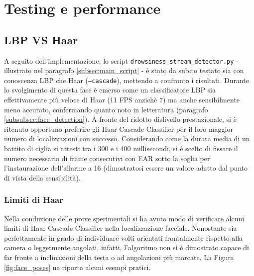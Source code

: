 \documentclass[12pt]{article}
\begin{document}
\newpage



\section{Testing e performance}

\subsection{LBP VS Haar}
A seguito dell'implementazione, lo script \texttt{drowsiness\_stream\_detector.py} - illustrato nel paragrafo \ref{subsec:main_script} -  è stato da subito testato sia con conoscenza LBP che Haar (\texttt{--cascade}), mettendo a confronto i risultati. Durante lo svolgimento di questa fase è emerso come un classificatore LBP sia effettivamente più veloce di Haar (11 FPS anzichè 7) ma anche sensibilmente meno accurato, confermando quanto noto in letteratura (paragrafo \ref{subsubsec:face_detection}). A fronte del ridotto dislivello prestazionale, si è ritenuto opportuno preferire gli Haar Cascade Classifier per il loro maggior numero di localizzazioni con successo. Considerando come la durata media di un battito di ciglia si attesti tra i 300 e i 400 millisecondi, si è scelto di fissare il numero necessario di frame consecutivi con EAR sotto la soglia per l'instaurazione dell'allarme a 16 (dimostratosi essere un valore adatto dal punto di vista della sensibilità).

\subsubsection{Limiti di Haar}
Nella conduzione delle prove sperimentali si ha avuto modo di verificare alcuni limiti di Haar Cascade Classifier nella localizzazione facciale. Nonostante sia perfettamente in grado di individuare volti orientati frontalmente rispetto alla camera o leggermente angolati, infatti, l'algoritmo non si è dimostrato capace di far fronte a inclinazioni della testa o ad angolazioni più marcate. La Figura \ref{fig:face_poses} ne riporta alcuni esempi pratici.
\end{document}

